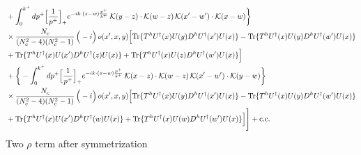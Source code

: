 \documentclass[9pt]{article}
\numberwithin{equation}{section}
\begin{document}
\begin{align}
&+\int_{0}^{k^{+}}dp^{+}\Big[\frac{1}{p^{+}}\Big]_{+}e^{-ik\cdot(z-w)\frac{p^{+}}{k^{+}}}\,\mathcal{K}(y-z)\cdot\mathcal{K}(w-z)\,\mathcal{K}(x'-w')\cdot\mathcal{K}(x-w)\bigg\}\notag\\
&\times \frac{N_{c}}{(N_{c}^{2}-4)(N_{c}^{2}-1)}\,\Big(-i\Big)\,o(x',x,y)\Big[{\rm Tr}\{T^{h}U^{\dagger}(x)U(y)D^{h}U^{\dagger}(x')U(x)\}-{\rm Tr}\{T^{h}U^{\dagger}(x)U(y)D^{h}U^{\dagger}(w')U(x)\}\notag\\
& +{\rm Tr}\{T^{h}U^{\dagger}(x)U(x')D^{h}U^{\dagger}(z)U(x)\}+{\rm Tr}\{T^{h}U^{\dagger}(x)U(z)D^{h}U^{\dagger}(w')U(x)\}\Big]\notag\\
&+\bigg\{-\int_{0}^{k^{+}}dp^{+}\Big[\frac{1}{p^{+}}\Big]_{+}e^{-ik\cdot(z-w)\frac{p^{+}}{k^{+}}}\,\mathcal{K}(x-z)\cdot\mathcal{K}(w-z)\,\mathcal{K}(x'-w')\cdot\mathcal{K}(y-w)\bigg\}\notag\\
&\times \frac{N_{c}}{(N_{c}^{2}-4)(N_{c}^{2}-1)}\,\Big(-i\Big)\,o(x',x,y)\Big[{\rm Tr}\{T^{h}U^{\dagger}(x)U(y)D^{h}U^{\dagger}(x')U(x)\}-{\rm Tr}\{T^{h}U^{\dagger}(x)U(y)D^{h}U^{\dagger}(w')U(x)\}\notag\\
& +{\rm Tr}\{T^{h}U^{\dagger}(x)U(x')D^{h}U^{\dagger}(w)U(x)\}+{\rm Tr}\{T^{h}U^{\dagger}(x)U(w)D^{h}U^{\dagger}(w')U(x)\}\Big]\Bigg]+{\rm c.c.}\label{eq:E-I.III-3}
\end{align}
Two $\rho$ term after symmetrization
\end{document}
